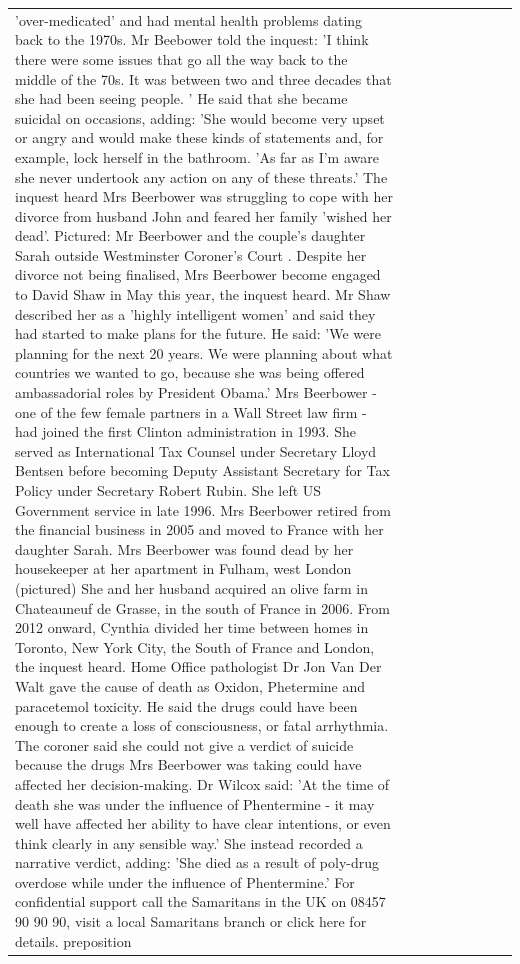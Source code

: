 \begin{table}[H]
\begin{tabular}{lllrlllll}
'over-medicated' and had mental health problems dating back to the 1970s. Mr Beebower told the inquest: 'I think there were some issues that go all the way back to the middle of the 70s. It was between two and three decades that she had been seeing people. ' He said that she became suicidal on occasions, adding: 'She would become very upset or angry and would make these kinds of statements and, for example, lock herself in the bathroom. 'As far as I'm aware she never undertook any action on any of these threats.' The inquest heard Mrs Beerbower was struggling to cope with her divorce from husband John and feared her family 'wished her dead'. Pictured: Mr Beerbower and the couple's daughter Sarah outside Westminster Coroner's Court . Despite her divorce not being finalised, Mrs Beerbower become engaged to David Shaw in May this year, the inquest heard. Mr Shaw described her as a 'highly intelligent women' and said they had started to make plans for the future. He said: 'We were planning for the next 20 years. We were planning about what countries we wanted to go, because she was being offered ambassadorial roles by President Obama.' Mrs Beerbower - one of the few female partners in a Wall Street law firm - had joined the first Clinton administration in 1993. She served as International Tax Counsel under Secretary Lloyd Bentsen before becoming Deputy Assistant Secretary for Tax Policy under Secretary Robert Rubin. She left US Government service in late 1996. Mrs Beerbower retired from the financial business in 2005 and moved to France with her daughter Sarah. Mrs Beerbower was found dead by her housekeeper at her apartment in Fulham, west London (pictured) She and her husband acquired an olive farm in Chateauneuf de Grasse, in the south of France in 2006. From 2012 onward, Cynthia divided her time between homes in Toronto, New York City, the South of France and London, the inquest heard. Home Office pathologist Dr Jon Van Der Walt gave the cause of death as Oxidon, Phetermine and paracetemol toxicity. He said the drugs could have been enough to create a loss of consciousness, or fatal arrhythmia. The coroner said she could not give a verdict of suicide because the drugs Mrs Beerbower was taking could have affected her decision-making. Dr Wilcox said: 'At the time of death she was under the influence of Phentermine - it may well have affected her ability to have clear intentions, or even think clearly in any sensible way.' She instead recorded a narrative verdict, adding: 'She died as a result of poly-drug overdose while under the influence of Phentermine.' For confidential support call the Samaritans in the UK on 08457 90 90 90, visit a local Samaritans branch or click here for details. preposition \\

\end{tabular}
\end{table}
